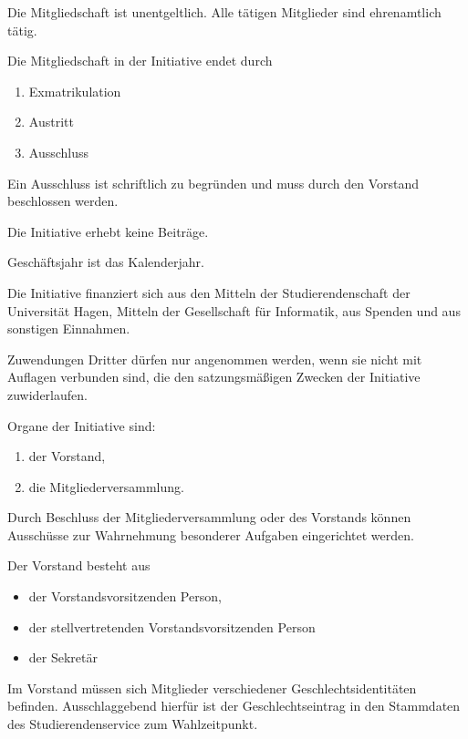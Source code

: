 \begin{contract}
Die Mitgliedschaft ist unentgeltlich. Alle tätigen Mitglieder sind ehrenamtlich tätig.

\label{sec:mitgliedschaftsende}

Die Mitgliedschaft in der Initiative endet durch
\begin{enumerate}
    \item Exmatrikulation
    \item Austritt
    \item Ausschluss
\end{enumerate}
Ein Ausschluss ist schriftlich zu begründen und muss durch den Vorstand beschlossen werden.

\label{sec:beiträge}

Die Initiative erhebt keine Beiträge.


\label{sec:geschäftsjahr}

Geschäftsjahr ist das Kalenderjahr.


Die Initiative finanziert sich aus den Mitteln der Studierendenschaft der Universität Hagen, Mitteln der Gesellschaft für Informatik, aus Spenden und aus sonstigen Einnahmen.

Zuwendungen Dritter dürfen nur angenommen werden, wenn sie nicht mit Auflagen verbunden sind, die den satzungsmäßigen Zwecken der Initiative zuwiderlaufen.


\label{sec:organe}

Organe der Initiative sind:
\begin{enumerate}
    \item der Vorstand,
    \item die Mitgliederversammlung.
\end{enumerate}
Durch Beschluss der Mitgliederversammlung oder des Vorstands können Ausschüsse zur Wahrnehmung besonderer Aufgaben eingerichtet werden.


\label{sec:vorstand}


Der Vorstand besteht aus 
\begin{itemize}
    \item der Vorstandsvorsitzenden Person,
    \item der stellvertretenden Vorstandsvorsitzenden Person
    \item der Sekretär
\end{itemize}  \label{sec:vorstand-posten}
Im Vorstand müssen sich Mitglieder verschiedener Geschlechtsidentitäten befinden. Ausschlaggebend hierfür ist der Geschlechtseintrag in den Stammdaten des Studierendenservice zum Wahlzeitpunkt.


\end{contract}
